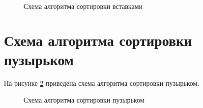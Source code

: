 \begin{figure}[h!]
	\caption{Схема алгоритма сортировки вставками}
	
	\label{fig:insertion}
	
\end{figure}

\section{Схема алгоритма сортировки пузырьком}

На рисунке \ref{fig:bubble} приведена схема алгоритма сортировки пузырьком.

\begin{figure}[h!]
	
	
	\caption{Схема алгоритма сортировки пузырьком}
	
	\label{fig:bubble}
	
\end{figure}

